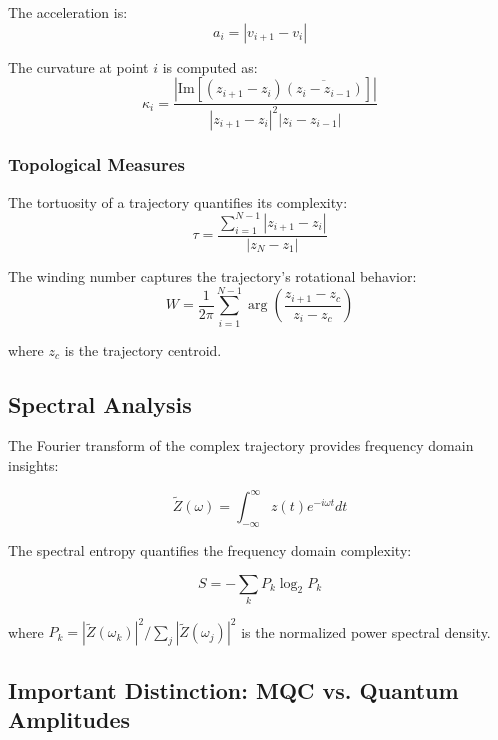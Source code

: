 The acceleration is:
\begin{equation}
a_i = |v_{i+1} - v_i|
\label{eq:acceleration}
\end{equation}

The curvature at point $i$ is computed as:
\begin{equation}
\kappa_i = \frac{|\text{Im}[(z_{i+1} - z_i)\overline{(z_i - z_{i-1})}]|}{|z_{i+1} - z_i|^2 |z_i - z_{i-1}|}
\label{eq:curvature}
\end{equation}

\subsubsection{Topological Measures}

The tortuosity of a trajectory quantifies its complexity:
\begin{equation}
\tau = \frac{\sum_{i=1}^{N-1} |z_{i+1} - z_i|}{|z_N - z_1|}
\label{eq:tortuosity}
\end{equation}

The winding number captures the trajectory's rotational behavior:
\begin{equation}
W = \frac{1}{2\pi} \sum_{i=1}^{N-1} \arg\left(\frac{z_{i+1} - z_c}{z_i - z_c}\right)
\label{eq:winding}
\end{equation}

where $z_c$ is the trajectory centroid.

\subsection{Spectral Analysis}

The Fourier transform of the complex trajectory provides frequency domain insights:

\begin{equation}
\tilde{Z}(\omega) = \int_{-\infty}^{\infty} z(t) e^{-i\omega t} dt
\label{eq:fourier}
\end{equation}

The spectral entropy quantifies the frequency domain complexity:

\begin{equation}
S = -\sum_k P_k \log_2 P_k
\label{eq:spectral_entropy}
\end{equation}

where $P_k = |\tilde{Z}(\omega_k)|^2 / \sum_j |\tilde{Z}(\omega_j)|^2$ is the normalized power spectral density.

\subsection{Important Distinction: MQC vs. Quantum Amplitudes}

